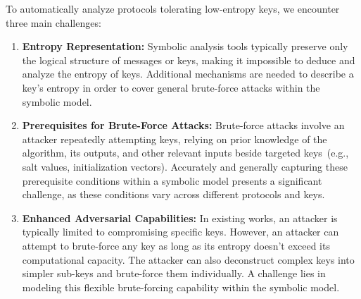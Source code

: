 \documentclass[../main.tex]{subfiles}  %
\begin{document}
To automatically analyze protocols tolerating low-entropy keys, we encounter three main challenges:
\begin{enumerate}[leftmargin=*]
    \item \textbf{Entropy Representation:}
    Symbolic analysis tools typically preserve only the logical structure of messages or keys, making it impossible to deduce and analyze the entropy of keys.
    Additional mechanisms are needed to describe a key's entropy in order to cover general brute-force attacks within the symbolic model.
    \item \textbf{Prerequisites for Brute-Force Attacks:}
    Brute-force attacks involve an attacker repeatedly attempting keys, relying on prior knowledge of the algorithm, its outputs, and other relevant inputs beside targeted keys~(e.g., salt values, initialization vectors). 
    Accurately and generally capturing these prerequisite conditions within a symbolic model presents a significant challenge, as these conditions vary across different protocols and keys.
    \item \textbf{Enhanced Adversarial Capabilities:}
    In existing works, an attacker is typically limited to compromising specific keys. 
    However, an attacker can attempt to brute-force any key as long as its entropy doesn't exceed its computational capacity. 
    The attacker can also deconstruct complex keys into simpler sub-keys and brute-force them individually. 
    A challenge lies in modeling this flexible brute-forcing capability within the symbolic model.
\end{enumerate}
\end{document}
